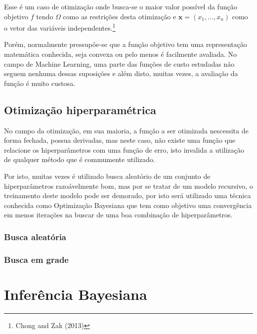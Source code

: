 \documentclass[
	12pt,				%
	a4paper,		%
	oneside,    %
	chapter=TITLE,		   %
	section=TITLE,		   %
	subsection=TITLE,	   %
	subsubsection=TITLE, %
	english,			%
	french,				%
	spanish,			%
	brazil,				%
]{abntex2}
\begin{document}
Esse é um caso de otimização onde busca-se o maior valor possível da
função objetivo \(f\) tendo \(\Omega\) como as restrições desta
otimização e \(\boldsymbol{x} = (x_1,...,x_n)\) como o vetor das
variáveis independentes.\footnote{Chong and Zak (2013)}

Porém, normalmente pressupõe-se que a função objetivo tem uma
representação matemática conhecida, seja convexa ou pelo menos é
facilmente avaliada. No campo de Machine Learning, uma parte das funções
de custo estudadas não seguem nenhuma dessas suposições e além disto,
muitas vezes, a avaliação da função é muito custosa.

\hypertarget{otimizauxe7uxe3o-hiperparamuxe9trica}{%
\subsection{Otimização
hiperparamétrica}\label{otimizauxe7uxe3o-hiperparamuxe9trica}}

No campo da otimização, em sua maioria, a função a ser otimizada
nescessita de forma fechada, possua derivadas, mas neste caso, não
existe uma função que relacione os hiperparâmetros com uma função de
erro, isto invalida a utilização de qualquer método que é commumente
utilizado.

Por isto, muitas vezes é utilizado busca aleatório de um conjunto de
hiperparâmetros razoávelmente bom, mas por se tratar de um modelo
recursivo, o treinamento deste modelo pode ser demorado, por isto será
utilizado uma técnica conhecida como Optimização Bayesiana que tem como
objetivo uma convergência em menos iterações na buscar de uma boa
combinação de hiperparâmetros.

\hypertarget{busca-aleatuxf3ria}{%
\subsubsection{Busca aleatória}\label{busca-aleatuxf3ria}}

\hypertarget{busca-em-grade}{%
\subsubsection{Busca em grade}\label{busca-em-grade}}

\hypertarget{inferuxeancia-bayesiana}{%
\section{Inferência Bayesiana}\label{inferuxeancia-bayesiana}}
\end{document}
